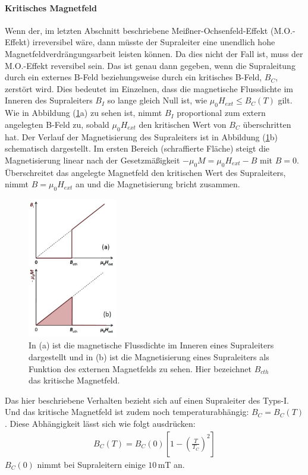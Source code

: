 \paragraph{Kritisches Magnetfeld}
Wenn der, im letzten Abschnitt beschriebene Mei{\ss}ner-Och{\-}sen{\-}feld-Effekt (M.O.-Effekt) irreversibel w\"{a}re, dann m\"{u}sste der Supraleiter eine unendlich hohe Magnetfeldverdrängungsarbeit leisten k\"{o}nnen.
Da dies nicht der Fall ist, muss der M.O.-Effekt reversibel sein.
Das ist genau dann gegeben, wenn die Supraleitung durch ein externes B-Feld beziehungsweise durch ein kritisches B-Feld, $B_C$, zerst\"{o}rt wird.
Dies bedeutet im Einzelnen, dass die magnetische Flussdichte im Inneren des Supraleiters $B_I$ so lange gleich Null ist, wie $\mu_0H_{ext} \leq B_C(T)$ gilt.
Wie in Abbildung (\ref{abb:kritischesBFeld}a) zu sehen ist, nimmt $B_I$ proportional zum extern angelegten B-Feld zu, sobald $\mu_0H_{ext}$ den kritischen Wert von $B_C$ \"{u}berschritten hat.
Der Verlauf der Magnetisierung des Supraleiters ist in Abbildung (\ref{abb:kritischesBFeld}b) schematisch dargestellt.
Im ersten Bereich (schraffierte Fl\"{a}che) steigt die Magnetisierung linear nach der Gesetzm\"{a}{\ss}igkeit $-\mu_0M = \mu_0H_{ext} - B$ mit $B = 0$.
\"Uberschreitet das angelegte Magnetfeld den kritischen Wert des Supraleiters, nimmt $B = \mu_0H_{ext}$ an und die Magnetisierung bricht zusammen.
\begin{figure}
	\centering
	\includegraphics[width=0.35\textwidth]{Plots/kritischesBFeld.png}
 	\caption{In (a) ist die magnetische Flussdichte im Inneren eines Supraleiters dargestellt und in (b) ist die Magnetisierung eines Supraleiters als Funktion des externen Magnetfelds zu sehen. Hier bezeichnet $B_{cth}$ das kritische Magnetfeld. \cite{anleitung}}
	\label{abb:kritischesBFeld}
\end{figure}
Das hier beschriebene Verhalten bezieht sich auf einen Supraleiter des Typs-I.
Und das kritische Magnetfeld ist zudem noch temperaturabh\"{a}ngig: $B_C = B_C(T)$.
Diese Abh\"{a}ngigkeit l\"{a}sst sich wie folgt ausdr\"{u}cken:
\begin{align*}
	B_C(T) = B_C(0) \left[ 1 - \left( \frac{T}{T_C} \right)^2 \right]
\end{align*}
$B_C(0)$ nimmt bei Supraleitern einige $10 \, $mT an.

